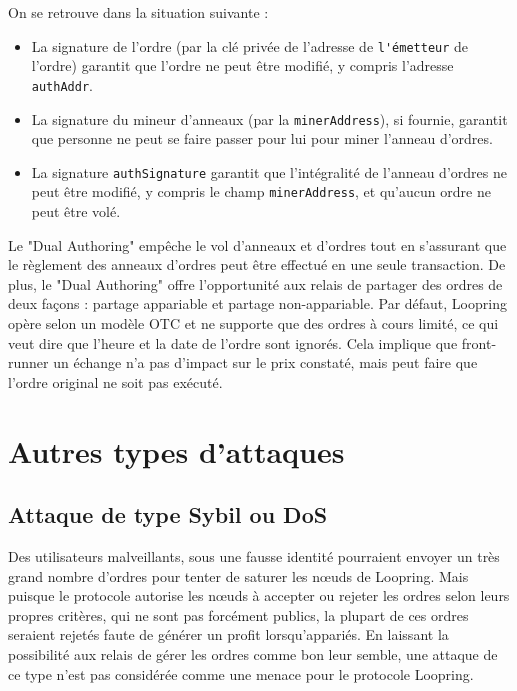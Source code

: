 \documentclass[UTF8,nofonts]{article}
\begin{document}
\begin{multicols}{2}
\begin{enumerate}
\end{enumerate}

On se retrouve dans la situation suivante :

\begin{itemize}

	\item  La signature de l'ordre (par la clé privée de l'adresse de \verb|l'émetteur| de l'ordre) garantit que l'ordre ne peut être modifié, y compris l'adresse \verb|authAddr|.
	\item  La signature du mineur d'anneaux (par la \verb|minerAddress|), si fournie, garantit que personne ne peut se faire passer pour lui pour miner l'anneau d'ordres.
	\item  La signature \verb|authSignature| garantit que l'intégralité de l'anneau d'ordres ne peut être modifié, y compris le champ \verb|minerAddress|, et qu'aucun ordre ne peut être volé.

\end{itemize}

Le "Dual Authoring" empêche le vol d'anneaux et d'ordres tout en s'assurant que le règlement des anneaux d'ordres peut être effectué en une seule transaction. De plus, le "Dual Authoring" offre l'opportunité aux relais de partager des ordres de deux façons : partage appariable et partage non-appariable. Par défaut, Loopring opère selon un modèle OTC et ne supporte que des ordres à cours limité, ce qui veut dire que l'heure et la date de l'ordre sont ignorés. Cela implique que front-runner un échange n'a pas d'impact sur le prix constaté, mais peut faire que l'ordre original ne soit pas exécuté.

\section{Autres types d'attaques}

\subsection{Attaque de type Sybil ou DoS}
Des utilisateurs malveillants, sous une fausse identité pourraient envoyer un très grand nombre d'ordres pour tenter de saturer les nœuds de Loopring. Mais puisque le protocole autorise les nœuds à accepter ou rejeter les ordres selon leurs propres critères, qui ne sont pas forcément publics, la plupart de ces ordres seraient rejetés faute de générer un profit lorsqu'appariés. En laissant la possibilité aux relais de gérer les ordres comme bon leur semble, une attaque de ce type n'est pas considérée comme une menace pour le protocole Loopring.


\end{multicols}
\end{document}
